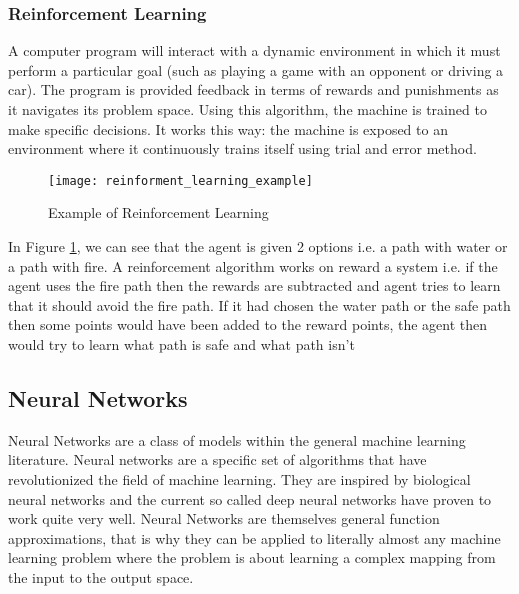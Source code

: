 \subsubsection{Reinforcement Learning}
A computer program will interact with a dynamic environment in which it must perform a particular goal (such as playing a game with an
opponent or driving a car). The program is provided feedback in terms of rewards and punishments as it navigates its problem space. 
Using this algorithm, the machine is trained to make specific decisions. It works this way: the machine is exposed to an environment
where it continuously trains itself using trial and error method.
\begin{figure}[h]
  \centering
  \texttt{[image: reinforment\_learning\_example]}
  \caption{Example of Reinforcement Learning}
  \label{fig:reinforment_learning_example}
\end{figure}
In Figure \ref{fig:reinforment_learning_example}, we can see that the agent is given 2 options i.e. a path with water or a path with fire. A reinforcement algorithm
works on reward a system i.e. if the agent uses the fire path then the rewards are subtracted and agent tries to learn that it should avoid
the fire path. If it had chosen the water path or the safe path then some points would have been added to the reward points, the agent then
would try to learn what path is safe and what path isn’t

\subsection{Neural Networks}
Neural Networks are a class of models within the general machine learning literature. Neural networks are a specific set of algorithms that
have revolutionized the field of machine learning. They are inspired by biological neural networks and the current so called deep neural
networks have proven to work quite very well. Neural Networks are themselves general function approximations, that is why they can be applied
to literally almost any machine learning problem where the problem is about learning a complex mapping from the input to the output space.

